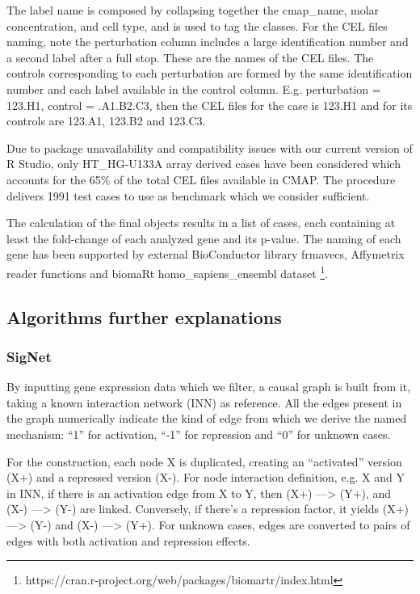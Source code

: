 The label name is composed by collapsing together the cmap\_name, molar concentration, and cell type, and is used to tag the classes. For the CEL files naming, note the perturbation column includes a large identification number and a second label after a full stop. These are the names of the CEL files. The controls corresponding to each perturbation are formed by the same identification number and each label available in the control column. E.g. perturbation = 123.H1, control = .A1.B2.C3, then the CEL files for the case is 123.H1 and for its controls are 123.A1, 123.B2 and 123.C3. 

Due to package unavailability and compatibility issues with our current version of R Studio, only HT\_HG-U133A array derived cases have been considered which accounts for the 65\% of the total CEL files available in CMAP. The procedure delivers 1991 test cases to use as benchmark which we consider sufficient.

The calculation of the final objects results in a list of cases, each containing at least the fold-change of each analyzed gene and its p-value. The naming of each gene has been supported by external BioConductor library frmavecs, Affymetrix reader functions and biomaRt homo\_sapiens\_ensembl dataset \footnote{https://cran.r-project.org/web/packages/biomartr/index.html}.
\label{section:suppl:bench}

\subsection{Algorithms further explanations}
\label{section:suppl:algorithms}

\subsubsection{SigNet}
\label{section:suppl:algorithms-signet}
By inputting gene expression data which we filter, a causal graph is built from it, taking a known interaction network (INN) as reference. All the edges present in the graph numerically indicate the kind of edge from which we derive the named mechanism: “1” for activation, “-1” for repression and “0” for unknown cases.

For the construction, each node X is duplicated, creating an “activated” version (X+) and a repressed version (X-). For node interaction definition, e.g. X and Y in INN, if there is an activation edge from X to Y, then (X+) —> (Y+), and (X-) —> (Y-) are linked. Conversely, if there’s a repression factor, it yields (X+) —> (Y-) and (X-) —> (Y+). For unknown cases, edges are converted to pairs of edges with both activation and repression effects.

